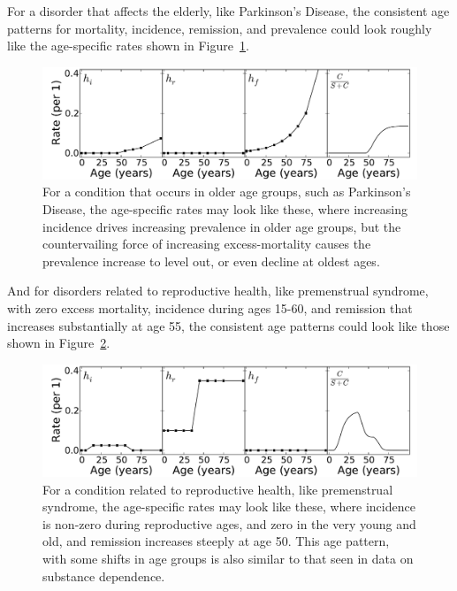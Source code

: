 For a disorder that affects the elderly, like Parkinson's Disease, the
consistent age patterns for mortality, incidence, remission, and
prevalence could look roughly like the age-specific rates shown in
Figure~\ref{forward-sim-old-age}.

\begin{figure}[h]
\begin{center}
\includegraphics[width=\textwidth]{forward-sim-old_age.pdf}
\caption{For a condition that occurs in older age groups, such as
  Parkinson's Disease, the age-specific rates may look like these,
  where increasing incidence drives increasing prevalence in older age
  groups, but the countervailing force of increasing excess-mortality
  causes the prevalence increase to level out, or even decline at
  oldest ages.}
\label{forward-sim-old-age}
\end{center}
\end{figure}

And for disorders related to reproductive health, like premenstrual
syndrome, with zero excess mortality, incidence during ages 15-60, and
remission that increases substantially at age 55, the consistent age
patterns could look like those shown in
Figure~\ref{forward-sim-reproductive}.

\begin{figure}[h]
\begin{center}
\includegraphics[width=\textwidth]{forward-sim-reproductive.pdf}
\caption{For a condition related to reproductive health, like
  premenstrual syndrome, the age-specific rates may look like these,
  where incidence is non-zero during reproductive ages, and zero in
  the very young and old, and remission increases steeply at age
  50. This age pattern, with some shifts in age groups is also similar
  to that seen in data on substance dependence.}
\label{forward-sim-reproductive}
\end{center}
\end{figure}



